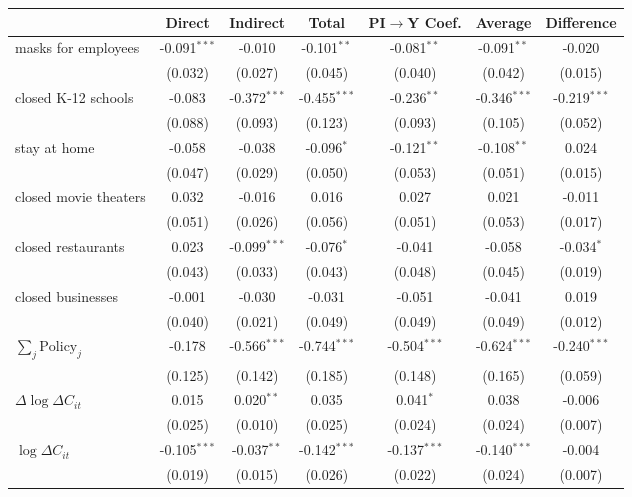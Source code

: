 
\begin{tabular}{lccccc|>{}c}
\toprule
  & Direct & Indirect & Total & PI$\to$Y Coef. & Average & Difference\\
\midrule
masks for employees & -0.091$^{***}$ & -0.010 & -0.101$^{**}$ & -0.081$^{**}$ & -0.091$^{**}$ & -0.020\\
 & (0.032) & (0.027) & (0.045) & (0.040) & (0.042) & (0.015)\\
closed K-12 schools & -0.083 & -0.372$^{***}$ & -0.455$^{***}$ & -0.236$^{**}$ & -0.346$^{***}$ & -0.219$^{***}$\\
 & (0.088) & (0.093) & (0.123) & (0.093) & (0.105) & (0.052)\\
stay at home & -0.058 & -0.038 & -0.096$^{*}$ & -0.121$^{**}$ & -0.108$^{**}$ & 0.024\\
 & (0.047) & (0.029) & (0.050) & (0.053) & (0.051) & (0.015)\\
closed movie theaters & 0.032 & -0.016 & 0.016 & 0.027 & 0.021 & -0.011\\
 & (0.051) & (0.026) & (0.056) & (0.051) & (0.053) & (0.017)\\
closed restaurants & 0.023 & -0.099$^{***}$ & -0.076$^{*}$ & -0.041 & -0.058 & -0.034$^{*}$\\
 & (0.043) & (0.033) & (0.043) & (0.048) & (0.045) & (0.019)\\
closed businesses & -0.001 & -0.030 & -0.031 & -0.051 & -0.041 & 0.019\\
 & (0.040) & (0.021) & (0.049) & (0.049) & (0.049) & (0.012)\\
$\sum_j \mathrm{Policy}_j$ & -0.178 & -0.566$^{***}$ & -0.744$^{***}$ & -0.504$^{***}$ & -0.624$^{***}$ & -0.240$^{***}$\\
 & (0.125) & (0.142) & (0.185) & (0.148) & (0.165) & (0.059)\\
$\Delta \log \Delta C_{it}$ & 0.015 & 0.020$^{**}$ & 0.035 & 0.041$^{*}$ & 0.038 & -0.006\\
 & (0.025) & (0.010) & (0.025) & (0.024) & (0.024) & (0.007)\\
$\log \Delta C_{it}$ & -0.105$^{***}$ & -0.037$^{**}$ & -0.142$^{***}$ & -0.137$^{***}$ & -0.140$^{***}$ & -0.004\\
 & (0.019) & (0.015) & (0.026) & (0.022) & (0.024) & (0.007)\\
\bottomrule
\end{tabular}